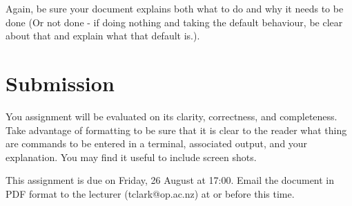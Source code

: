 \documentclass{article}
\begin{document}
Again, be sure your document explains both what to do and why it needs to be done (Or not done - if
doing nothing and taking the default behaviour, be clear about that and explain what that default is.).

\section{Submission}
You assignment will be evaluated on its clarity, correctness, and completeness. Take advantage of formatting to be
sure that it is clear to the reader what thing are commands to be entered in a terminal, associated output, and your 
explanation. You may find it useful to include screen shots.

This assignment is due on Friday, 26 August at 17:00.  Email the document in PDF format to the lecturer (tclark@op.ac.nz) at or before this time.
\end{document}
